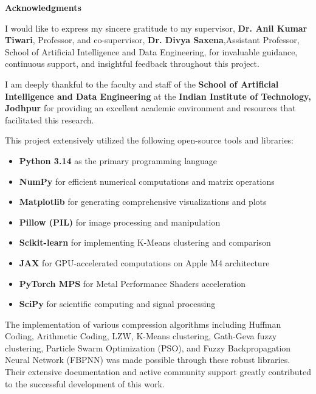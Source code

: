 \begin{flushright}
\huge{\textbf{Acknowledgments}}
\end{flushright}

\vspace{0.5cm}

I would like to express my sincere gratitude to my supervisor, \textbf{Dr. Anil Kumar Tiwari}, Professor, and co-supervisor, \textbf{Dr. Divya Saxena},Assistant Professor, School of Artificial Intelligence and Data Engineering, for invaluable guidance, continuous support, and insightful feedback throughout this project.

I am deeply thankful to the faculty and staff of the \textbf{School of Artificial Intelligence and Data Engineering} at the \textbf{Indian Institute of Technology, Jodhpur} for providing an excellent academic environment and resources that facilitated this research.

\vspace{0.3cm}

This project extensively utilized the following open-source tools and libraries:
\begin{itemize}
    \item \textbf{Python 3.14} as the primary programming language
    \item \textbf{NumPy} for efficient numerical computations and matrix operations
    \item \textbf{Matplotlib} for generating comprehensive visualizations and plots
    \item \textbf{Pillow (PIL)} for image processing and manipulation
    \item \textbf{Scikit-learn} for implementing K-Means clustering and comparison
    \item \textbf{JAX} for GPU-accelerated computations on Apple M4 architecture
    \item \textbf{PyTorch MPS} for Metal Performance Shaders acceleration
    \item \textbf{SciPy} for scientific computing and signal processing
\end{itemize}

The implementation of various compression algorithms including Huffman Coding, Arithmetic Coding, LZW, K-Means clustering, Gath-Geva fuzzy clustering, Particle Swarm Optimization (PSO), and Fuzzy Backpropagation Neural Network (FBPNN) was made possible through these robust libraries. Their extensive documentation and active community support greatly contributed to the successful development of this work.

